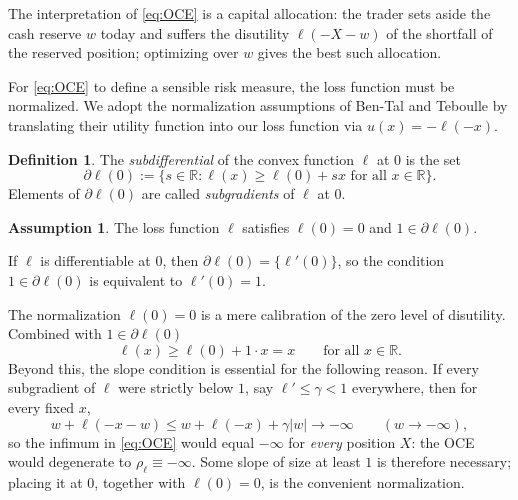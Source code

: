 \documentclass[11pt,a4paper]{report}
\numberwithin{equation}{chapter}
\theoremstyle{plain}
\theoremstyle{definition}
\newtheorem{assumption}[proposition]{Assumption}
\newtheorem{definition}[proposition]{Definition}
\newcommand{\R}{\mathbb{R}}
\begin{document}
The interpretation of \eqref{eq:OCE} is a capital allocation: the trader sets aside the cash reserve $w$ today and suffers the disutility $\ell(-X-w)$ of the shortfall of the reserved position; optimizing over $w$ gives the best such allocation.

For \eqref{eq:OCE} to define a sensible risk measure, the loss function must be normalized. We adopt the normalization assumptions of Ben-Tal and Teboulle \cite[Definition~2.1, Equation~(2.1)]{bentalteboulle} by translating their utility function into our loss function via $u(x)=-\ell(-x)$.

\begin{definition}\label{def:subdifferential}
    The \emph{subdifferential} of the convex function $\ell$ at $0$ is the set
    \[
        \partial\ell(0):=\bigl\{s\in\R:\ell(x)\ge\ell(0)+sx\text{ for all }x\in\R\bigr\}.
    \]
    Elements of $\partial\ell(0)$ are called \emph{subgradients} of $\ell$ at $0$.
\end{definition}

\begin{assumption}\label{ass:normalization}
    The loss function $\ell$ satisfies $\ell(0)=0$ and $1\in\partial\ell(0)$.
\end{assumption}
If $\ell$ is differentiable at $0$, then $\partial\ell(0)=\{\ell'(0)\}$, so the condition $1\in\partial\ell(0)$ is equivalent to $\ell'(0)=1$.

The normalization $\ell(0)=0$ is a mere calibration of the zero level of disutility. Combined with $1\in\partial\ell(0)$
\[
    \ell(x)\ge \ell(0) + 1\cdot x=x\qquad\text{for all }x\in\R.
\]
Beyond this, the slope condition is essential for the following reason. If every subgradient of $\ell$ were strictly below $1$, say $\ell'\le\gamma<1$ everywhere, then for every fixed $x$,
\[
    w+\ell(-x-w)\le w+\ell(-x)+\gamma|w|\longrightarrow-\infty\qquad(w\to-\infty),
\]
so the infimum in \eqref{eq:OCE} would equal $-\infty$ for \emph{every} position $X$: the OCE would degenerate to $\rho_\ell\equiv-\infty$. Some slope of size at least $1$ is therefore necessary; placing it at $0$, together with $\ell(0)=0$, is the convenient normalization.
\end{document}
